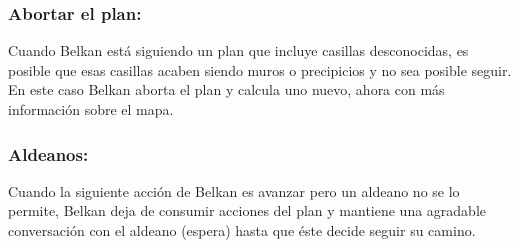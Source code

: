 \documentclass{article}
\begin{document}
\subsubsection*{Abortar el plan:}
Cuando Belkan está siguiendo un plan que incluye casillas
desconocidas, es posible que esas casillas acaben siendo muros o
precipicios y no sea posible seguir. En este caso Belkan aborta el
plan y calcula uno nuevo, ahora con más información sobre el mapa.


\subsubsection*{Aldeanos:}
Cuando la siguiente acción de Belkan es avanzar pero un aldeano no se
lo permite, Belkan deja de consumir acciones del plan y mantiene una
agradable conversación con el aldeano (espera) hasta que éste decide
seguir su camino.
\end{document}
